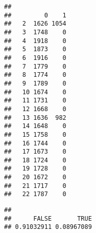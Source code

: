 \documentclass[
]{article}
\newenvironment{Shaded}{\begin{snugshade}}{\end{snugshade}}
\newcommand{\CommentTok}[1]{\textcolor[rgb]{0.56,0.35,0.01}{\textit{#1}}}
\newcommand{\DecValTok}[1]{\textcolor[rgb]{0.00,0.00,0.81}{#1}}
\newcommand{\KeywordTok}[1]{\textcolor[rgb]{0.13,0.29,0.53}{\textbf{#1}}}
\newcommand{\NormalTok}[1]{#1}
\newcommand{\OperatorTok}[1]{\textcolor[rgb]{0.81,0.36,0.00}{\textbf{#1}}}
\newcommand{\OtherTok}[1]{\textcolor[rgb]{0.56,0.35,0.01}{#1}}
\newcommand{\StringTok}[1]{\textcolor[rgb]{0.31,0.60,0.02}{#1}}
\begin{document}
\begin{verbatim}
##     
##         0    1
##   2  1626 1054
##   3  1748    0
##   4  1918    0
##   5  1873    0
##   6  1916    0
##   7  1779    0
##   8  1774    0
##   9  1789    0
##   10 1674    0
##   11 1731    0
##   12 1668    0
##   13 1636  982
##   14 1648    0
##   15 1758    0
##   16 1744    0
##   17 1673    0
##   18 1724    0
##   19 1728    0
##   20 1672    0
##   21 1717    0
##   22 1787    0
\end{verbatim}

\begin{Shaded}
\end{Shaded}

\begin{verbatim}
## 
##      FALSE       TRUE 
## 0.91032911 0.08967089
\end{verbatim}
\end{document}
